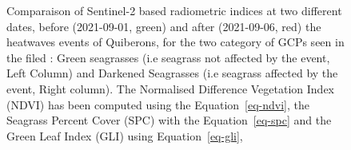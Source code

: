 \documentclass[
  number]{elsarticle}
\begin{document}
\label{cell-fig-NDVI_GLI_SPC}
\begin{figure}[H]


\caption{\label{fig-NDVI_GLI_SPC}Comparaison of Sentinel-2 based
radiometric indices at two different dates, before (2021-09-01, green)
and after (2021-09-06, red) the heatwaves events of Quiberons, for the
two category of GCPs seen in the filed : Green seagrasses (i.e seagrass
not affected by the event, Left Column) and Darkened Seagrasses (i.e
seagrass affected by the event, Right column). The Normalised Difference
Vegetation Index (NDVI) has been computed using the
Equation~\ref{eq-ndvi}, the Seagrass Percent Cover (SPC) with the
Equation~\ref{eq-spc} and the Green Leaf Index (GLI) using
Equation~\ref{eq-gli},}

\end{figure}%
\end{document}
